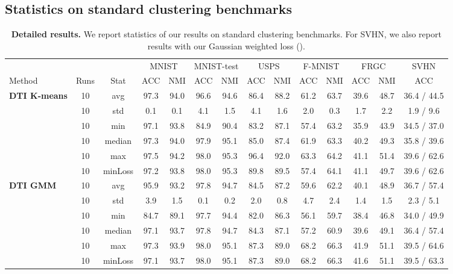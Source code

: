 \documentclass{article}
\begin{document}
\subsection{Statistics on standard clustering benchmarks}\label{sec:statistics}
\vspace{-1.5em}
\begin{table}[!hb]
  \renewcommand{\arraystretch}{1}
  \addtolength{\tabcolsep}{-4pt}
  \caption{\textbf{Detailed results.} We report statistics of our results on standard 
  clustering benchmarks. For SVHN, we also report results with our Gaussian weighted loss 
().}
  \vspace{0.2em}
  \centering
  \scriptsize
  \begin{tabular}{@{}lccccccccccccc@{}} \toprule
  &  & & \multicolumn{2}{c}{MNIST} & \multicolumn{2}{c}{MNIST-test} &
  \multicolumn{2}{c}{USPS} & \multicolumn{2}{c}{F-MNIST} & \multicolumn{2}{c}{FRGC} & SVHN\\
  \cmidrule(lr){4-5}  \cmidrule(lr){6-7}  \cmidrule(lr){8-9} \cmidrule(lr){10-11} 
  \cmidrule(lr){12-13} \cmidrule(ll){14-14}
  Method & Runs & Stat & ACC & NMI & ACC & NMI & ACC & NMI & ACC & NMI & ACC & NMI & ACC\\
  \midrule

  \textbf{DTI K-means}
  & 10 & avg &  97.3 &  94.0 & 96.6  & 94.6 & 86.4 & 88.2 & 61.2 & 63.7 & 39.6 & 48.7 & 
  36.4 / 44.5\\
  & 10 & std & 0.1 & 0.1 & 4.1 & 1.5 & 4.1 & 1.6 & 2.0 & 0.3 & 1.7 & 2.2 & 1.9 / 
  9.6\\
  & 10 & min & 97.1 & 93.8 & 84.9 & 90.4 & 83.2 & 87.1 & 57.4 & 63.2 & 35.9 & 43.9 & 34.5 / 
  37.0\\
  & 10 & median & 97.3 & 94.0 & 97.9 & 95.1 & 85.0 & 87.4 & 61.9 & 63.3 & 40.2 & 49.3 & 35.8 
  / 39.6\\
  & 10 & max & 97.5 & 94.2 & 98.0 & 95.3 & 96.4 & 92.0 & 63.3 & 64.2 & 41.1 & 51.4 & 39.6 / 
  62.6\\
  & 10 & minLoss & 97.2 & 93.8 & 98.0 & 95.3 & 89.8 & 89.5 & 57.4 & 64.1 & 41.1 & 49.7 & 39.6 
  / 62.6\\

  \textbf{DTI GMM}
  & 10 & avg & 95.9 & 93.2 & 97.8 & 94.7 & 84.5 & 87.2 & 59.6 & 62.2 & 40.1 & 48.9 & 36.7 / 
  57.4\\
  & 10 & std & 3.9 & 1.5 & 0.1 & 0.2 & 2.0 & 0.8 & 4.7 & 2.4 & 1.4 & 1.5 & 2.3 / 
  5.1\\
  & 10 & min & 84.7 & 89.1 & 97.7 & 94.4 & 82.0 & 86.3 & 56.1 & 59.7 & 38.4 & 46.8 & 34.0 / 
  49.9\\
  & 10 & median & 97.1 & 93.7 & 97.8 & 94.7 & 84.3 & 87.1 & 57.2 & 60.9 & 39.6 & 49.1 & 36.4 
  / 57.4\\
  & 10 & max & 97.3 & 93.9 & 98.0 & 95.1 & 87.3 & 89.0 & 68.2 & 66.3 & 41.9 & 51.1 & 39.5 / 
  64.6\\
  & 10 & minLoss & 97.1 & 93.7 & 98.0 & 95.1 & 87.3 & 89.0 & 68.2 & 66.3 & 41.6 & 51.1 & 39.5 
  / 63.3\\
  \bottomrule
  \end{tabular}
  \label{tab:stats}
\end{table}
\end{document}
